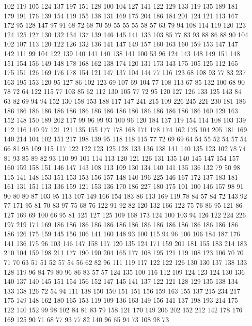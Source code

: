 102 119 105 124 137 197 151 128 100 104 127 141 122 129 133 119 135 189 181 179
191 176 139 154 119 155 138 131 169 175 204 186 184 201 124 121 113 167 172 95
128 147 97 91 68 72 68 70 59 55 55 55 58 57 63 79 94 108 114 119
120 123 124 125 127 130 132 134 137 139 146 145 141 133 103 85 77 83 93 88
86 88 90 104 102 107 113 120 122 126 132 136 141 147 149 157 160 163 160 159
153 147 147 142 111 99 104 122 139 140 141 140 138 141 100 53 96 124 143 148
149 151 148 151 154 156 149 148 178 168 162 138 174 120 131 173 143 175 105 125
112 165 175 151 126 169 176 178 154 121 147 137 104 144 77 116 123 68 108 93
77 83 237 163 195 153 120 95 127 86 102 123 69 107 69 104 77 108 113 67
85 132 100 68 90 78 72 64 122 115 77 103 85 62 112 130 105 77 72 95
120 127 126 133 125 143 84 63 82 69 94 94 152 130 158 153 188 117 147 241
215 109 226 245 221 230 181 186 186 186 186 186 186 186 186 186 186 186 186 186
186 186 186 186 160 129 163 152 148 150 189 202 117 99 96 99 93 100 96 120
184 137 119 154 114 108 103 139 112 116 140 97 121 121 135 155 177 178 168 171
178 174 162 175 104 205 181 169 140 214 104 102 151 217 198 139 95 118 118 115
77 72 69 69 64 54 55 52 54 57 54 66 81 98 109 115 117 122 122 123
125 128 133 136 138 141 140 135 123 102 78 74 81 93 85 89 82 93 110 99
101 114 113 120 121 126 131 135 140 145 147 154 157 160 159 158 151 146 147 143
108 113 109 130 134 140 141 135 136 132 79 50 98 115 141 148 153 151 153 153
156 157 148 140 196 225 146 167 172 137 183 181 161 131 151 113 136 159 121 153
136 170 186 227 180 175 101 100 146 157 98 91 90 80 80 87 103 95 113 107
149 166 154 183 86 113 169 119 78 84 57 84 72 143 92 77 171 95 81 70
83 97 75 68 76 122 91 92 82 120 132 166 122 75 76 86 95 121 86 127
169 69 100 66 95 81 125 127 125 109 168 173 124 100 103 94 126 122 224 226
197 219 171 169 186 186 186 186 186 186 186 186 186 186 186 186 186 186 186 186
126 175 159 145 156 106 141 160 148 93 100 115 94 96 106 106 184 187 176 141
136 175 96 103 146 147 158 117 120 135 124 171 159 201 181 155 183 214 183 210
104 159 198 211 177 190 190 204 165 177 108 195 121 119 108 123 106 70 70 71
70 63 51 51 52 57 54 56 62 82 96 111 119 117 122 122 126 130 130 137
138 133 128 119 96 84 79 80 96 86 83 57 57 124 135 100 116 112 109 124
123 124 130 136 140 137 140 145 151 154 156 152 147 145 141 137 122 121 128 129
135 138 134 133 138 126 72 54 94 111 138 150 150 151 151 156 159 163 155 137
215 234 217 175 149 148 162 180 165 153 119 109 136 163 149 156 141 137 198 193
214 175 122 140 152 99 98 102 84 81 83 79 158 121 170 149 206 202 152 212
142 178 176 169 125 90 71 68 77 93 77 82 140 96 65 94 73 108 98 73

